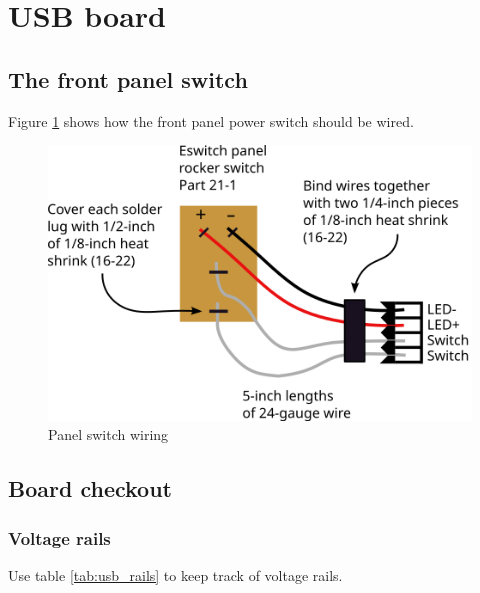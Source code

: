 \section{USB board}

\subsection{The front panel switch}
Figure \ref{fig:panel_switch_wiring} shows how the front panel power
switch should be wired.

\begin{figure}[ht]
  \begin{center}
    \includegraphics[clip,scale=1]{figs/panel_switch_wiring}
    \caption{Panel switch wiring \label{fig:panel_switch_wiring}}
  \end{center}
\end{figure}


\clearpage{}
\subsection{Board checkout}


\subsubsection{Voltage rails}
Use table \ref{tab:usb_rails} to keep track of voltage rails.


